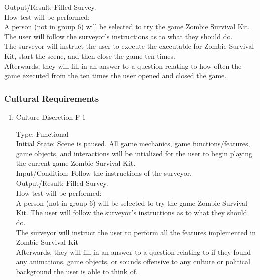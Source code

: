 \documentclass[12pt, titlepage]{article}
\begin{document}
\begin{enumerate}
	Output/Result: Filled Survey.\\
	
	How test will be performed:\\ A person (not in group 6) will be selected to try the game Zombie Survival Kit. The user will follow the surveyor's instructions as to what they should do. \\
	The surveyor will instruct the user to execute the executable for Zombie Survival Kit, start the scene, and then close the game ten times.\\
	Afterwards, they will fill in an answer to a question relating to how often the game executed from the ten times the user opened and closed the game. \\
	
\end{enumerate}

\subsubsection{Cultural Requirements}

\begin{enumerate}
	
	\item{Culture-Discretion-F-1\\}
	
	Type: Functional\\
	
	Initial State: Scene is paused. All game mechanics, game functions/features, game objects, and interactions will be intialized for the user to begin playing the current game Zombie Survival Kit.\\
	
	Input/Condition: Follow the instructions of the surveyor.\\
	
	Output/Result: Filled Survey.\\
	
	How test will be performed:\\ A person (not in group 6) will be selected to try the game Zombie Survival Kit. The user will follow the surveyor's instructions as to what they should do. \\
	The surveyor will instruct the user to perform all the features implemented in Zombie Survival Kit\\
	Afterwards, they will fill in an answer to a question relating to if they found any animations, game objects, or sounds offensive to any culture or political background the user is able to think of.\\
	
\end{enumerate}
\end{document}
